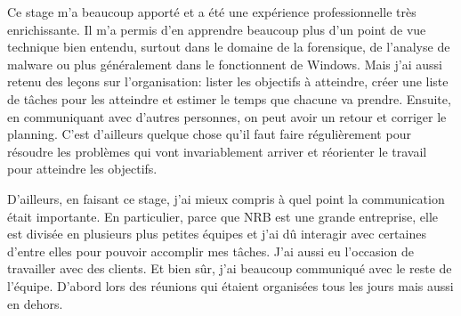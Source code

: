 Ce stage m'a beaucoup apporté et a été une expérience professionnelle très enrichissante. Il m'a permis d'en apprendre beaucoup plus d'un point de vue technique bien entendu, surtout dans le domaine de la forensique, de l'analyse de malware ou plus généralement dans le fonctionnent de Windows. Mais j'ai aussi retenu des leçons sur l'organisation: lister les objectifs à atteindre, créer une liste de tâches pour les atteindre et estimer le temps que chacune va prendre. Ensuite, en communiquant avec d'autres personnes, on peut avoir un retour et corriger le planning. C'est d'ailleurs quelque chose qu'il faut faire régulièrement pour résoudre les problèmes qui vont invariablement arriver et réorienter le travail pour atteindre les objectifs.

D'ailleurs, en faisant ce stage, j'ai mieux compris à quel point la communication était importante. En particulier, parce que NRB est une grande entreprise, elle est divisée en plusieurs plus petites équipes et j'ai dû interagir avec certaines d'entre elles pour pouvoir accomplir mes tâches. J'ai aussi eu l'occasion de travailler avec des clients. Et bien sûr, j'ai beaucoup communiqué avec le reste de l'équipe. D'abord lors des réunions qui étaient organisées tous les jours mais aussi en dehors.


